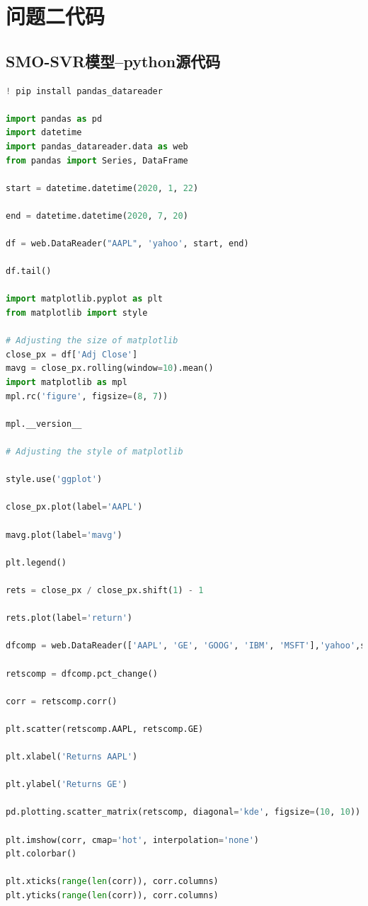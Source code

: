 \documentclass{whutmod}
\begin{document}
	\section{问题二代码}
\subsection*{SMO-SVR模型--python源代码}
\begin{lstlisting}[language=python]
! pip install pandas_datareader

import pandas as pd
import datetime
import pandas_datareader.data as web
from pandas import Series, DataFrame

start = datetime.datetime(2020, 1, 22)

end = datetime.datetime(2020, 7, 20)

df = web.DataReader("AAPL", 'yahoo', start, end)

df.tail()

import matplotlib.pyplot as plt
from matplotlib import style

# Adjusting the size of matplotlib
close_px = df['Adj Close']
mavg = close_px.rolling(window=10).mean()
import matplotlib as mpl
mpl.rc('figure', figsize=(8, 7))

mpl.__version__

# Adjusting the style of matplotlib

style.use('ggplot')

close_px.plot(label='AAPL')

mavg.plot(label='mavg')

plt.legend()

rets = close_px / close_px.shift(1) - 1

rets.plot(label='return')

dfcomp = web.DataReader(['AAPL', 'GE', 'GOOG', 'IBM', 'MSFT'],'yahoo',start=start,end=end)['Adj Close']

retscomp = dfcomp.pct_change()

corr = retscomp.corr()

plt.scatter(retscomp.AAPL, retscomp.GE)

plt.xlabel('Returns AAPL')

plt.ylabel('Returns GE')

pd.plotting.scatter_matrix(retscomp, diagonal='kde', figsize=(10, 10))

plt.imshow(corr, cmap='hot', interpolation='none')
plt.colorbar()

plt.xticks(range(len(corr)), corr.columns)
plt.yticks(range(len(corr)), corr.columns)


\end{lstlisting}
\end{document}
